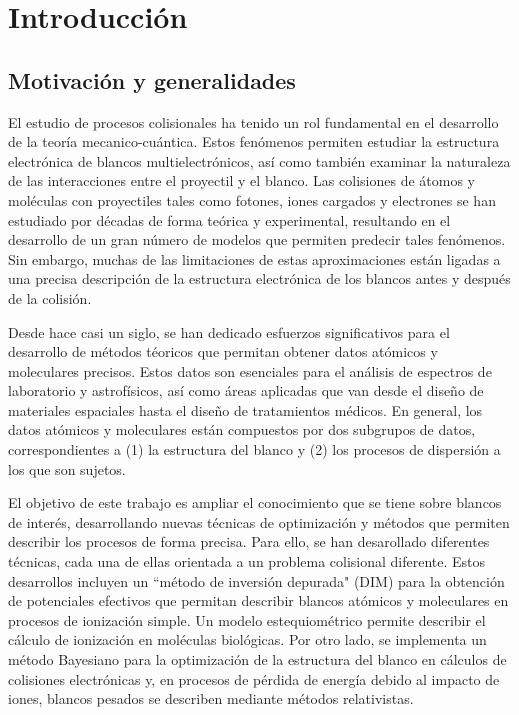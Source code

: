 \chapter{Introducción}

\section{Motivación y generalidades}

El estudio de procesos colisionales ha tenido un rol fundamental en el 
desarrollo de la teoría mecanico-cuántica. Estos fenómenos permiten 
estudiar la estructura electrónica de blancos multielectrónicos, así 
como también examinar la naturaleza de las interacciones entre el 
proyectil y el blanco. Las colisiones de átomos y moléculas con 
proyectiles tales como fotones, iones cargados y electrones se han 
estudiado por décadas de forma teórica y experimental, resultando en
el desarrollo de un gran número de modelos que permiten predecir tales 
fenómenos. Sin embargo, muchas de las limitaciones de estas 
aproximaciones están ligadas a una precisa descripción de la estructura 
electrónica de los blancos antes y después de la colisión. 

Desde hace casi un siglo, se han dedicado esfuerzos significativos para
el desarrollo de métodos téoricos que permitan obtener datos atómicos y 
moleculares precisos. Estos datos son esenciales para el análisis de 
espectros de laboratorio y astrofísicos, así como áreas aplicadas que 
van desde el diseño de materiales espaciales hasta el diseño de 
tratamientos médicos. En general, los datos atómicos y moleculares están 
compuestos por dos subgrupos de datos, correspondientes a (1) la 
estructura del blanco y (2) los procesos de dispersión a los que son 
sujetos. 

El objetivo de este trabajo es ampliar el conocimiento que se tiene 
sobre blancos de interés, desarrollando nuevas técnicas de optimización 
y métodos que permiten describir los procesos de forma precisa. Para 
ello, se han desarollado diferentes técnicas, cada una de ellas 
orientada a un problema colisional diferente. Estos desarrollos incluyen 
un ``método de inversión depurada" (DIM) para la obtención de 
potenciales efectivos que permitan describir blancos atómicos y 
moleculares en procesos de ionización simple. Un modelo estequiométrico 
permite describir el cálculo de ionización en moléculas biológicas. Por 
otro lado, se implementa un método Bayesiano para la optimización de la 
estructura del blanco en cálculos de colisiones electrónicas y, en 
procesos de pérdida de energía debido al impacto de iones, blancos 
pesados se describen mediante métodos relativistas. 

